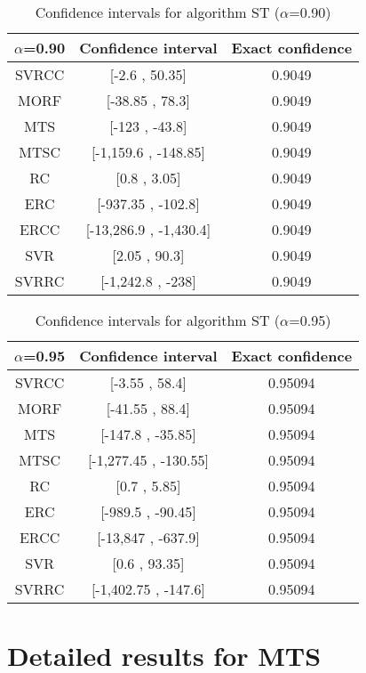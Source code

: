 \documentclass[a4paper,10pt]{article}
\begin{document}
\begin{table}[!htp]
\centering\small
\begin{tabular}{
|c|c|c|}
\hline
 $\alpha$=0.90 & Confidence interval & Exact confidence \\ \hline 
SVRCC & [-2.6 , 50.35] & 0.9049\\ \hline 
MORF & [-38.85 , 78.3] & 0.9049\\ \hline 
MTS & [-123 , -43.8] & 0.9049\\ \hline 
MTSC & [-1,159.6 , -148.85] & 0.9049\\ \hline 
RC & [0.8 , 3.05] & 0.9049\\ \hline 
ERC & [-937.35 , -102.8] & 0.9049\\ \hline 
ERCC & [-13,286.9 , -1,430.4] & 0.9049\\ \hline 
SVR & [2.05 , 90.3] & 0.9049\\ \hline 
SVRRC & [-1,242.8 , -238] & 0.9049\\ \hline 

\end{tabular}
\caption{Confidence intervals for algorithm ST ($\alpha$=0.90)}
\end{table}
\begin{table}[!htp]
\centering\small
\begin{tabular}{
|c|c|c|}
\hline
 $\alpha$=0.95 & Confidence interval & Exact confidence \\ \hline 
SVRCC & [-3.55 , 58.4] & 0.95094\\ \hline 
MORF & [-41.55 , 88.4] & 0.95094\\ \hline 
MTS & [-147.8 , -35.85] & 0.95094\\ \hline 
MTSC & [-1,277.45 , -130.55] & 0.95094\\ \hline 
RC & [0.7 , 5.85] & 0.95094\\ \hline 
ERC & [-989.5 , -90.45] & 0.95094\\ \hline 
ERCC & [-13,847 , -637.9] & 0.95094\\ \hline 
SVR & [0.6 , 93.35] & 0.95094\\ \hline 
SVRRC & [-1,402.75 , -147.6] & 0.95094\\ \hline 

\end{tabular}
\caption{Confidence intervals for algorithm ST ($\alpha$=0.95)}
\end{table}

 \clearpage 


\section{Detailed results for MTS}
\end{document}
